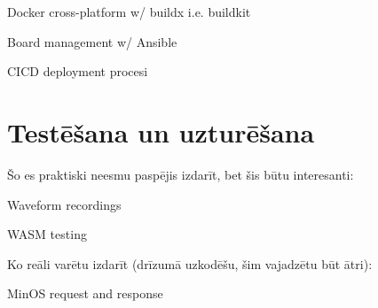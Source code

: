 Docker cross-platform w/ buildx i.e. buildkit

Board management w/ Ansible

CICD deployment procesi

\section{Testēšana un uzturēšana}

Šo es praktiski neesmu paspējis izdarīt, bet šis būtu interesanti:

Waveform recordings

WASM testing

Ko reāli varētu izdarīt (drīzumā uzkodēšu, šim vajadzētu būt ātri):

MinOS request and response
